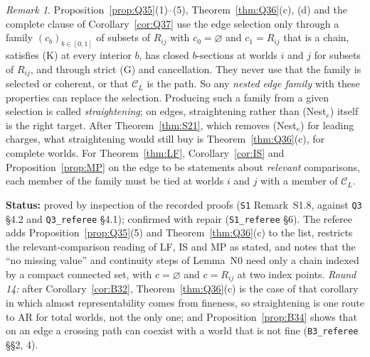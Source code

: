 \documentclass[11pt]{article}
\theoremstyle{definition}
\theoremstyle{remark}
\newtheorem{remark}[theorem]{Remark}
\newcommand{\C}{\mathcal C}
\newcommand{\src}[1]{\texttt{#1}}
\newcommand{\status}[1]{\par\smallskip\noindent\textbf{Status:} #1\par\smallskip}
\begin{document}
\begin{remark}\label{rem:straighten}
Proposition~\ref{prop:Q35}(1)--(5), Theorem~\ref{thm:Q36}(c), (d) and the complete clause of Corollary~\ref{cor:Q37} use the edge selection only through a family $(c_b)_{b\in[0,1]}$ of subsets of $R_{ij}$ with $c_0=\varnothing$ and $c_1=R_{ij}$ that is a chain, satisfies (K) at every interior $b$, has closed $b$-sections at worlds $i$ and $j$ for subsets of $R_{ij}$, and through strict (G) and cancellation. They never use that the family is selected or coherent, or that $\C_L$ is the path. So any \emph{nested edge family} with these properties can replace the selection. Producing such a family from a given selection is called \emph{straightening}; on edges, straightening rather than (Nest$_e$) itself is the right target. After Theorem~\ref{thm:S21}, which removes (Nest$_e$) for leading charges, what straightening would still buy is Theorem~\ref{thm:Q36}(c), for complete worlds. For Theorem~\ref{thm:LF}, Corollary~\ref{cor:IS} and Proposition~\ref{prop:MP} on the edge to be statements about \emph{relevant} comparisons, each member of the family must be tied at worlds $i$ and $j$ with a member of $\C_L$.
\end{remark}
\status{proved by inspection of the recorded proofs (\src{S1} Remark~S1.8, against \src{Q3} \S4.2 and \src{Q3\_referee} \S4.1); confirmed with repair (\src{S1\_referee} \S6). The referee adds Proposition~\ref{prop:Q35}(5) and Theorem~\ref{thm:Q36}(c) to the list, restricts the relevant-comparison reading of LF, IS and MP as stated, and notes that the ``no missing value'' and continuity steps of Lemma~N0 need only a chain indexed by a compact connected set, with $c=\varnothing$ and $c=R_{ij}$ at two index points. \emph{Round 14:} after Corollary~\ref{cor:B32}, Theorem~\ref{thm:Q36}(c) is the case of that corollary in which almost representability comes from fineness, so straightening is one route to AR for total worlds, not the only one; and Proposition~\ref{prop:B34} shows that on an edge a crossing path can coexist with a world that is not fine (\src{B3\_referee} \S\S2, 4).}
\end{document}
